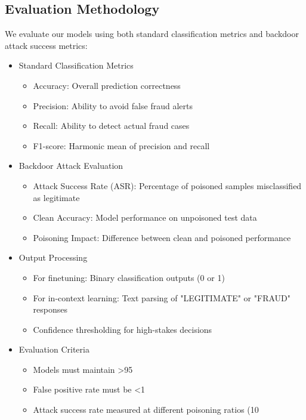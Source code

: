 \documentclass{article}
\begin{document}
\subsection{Evaluation Methodology}
We evaluate our models using both standard classification metrics and backdoor attack success metrics:

\begin{itemize}
    \item Standard Classification Metrics
    \begin{itemize}
        \item Accuracy: Overall prediction correctness
        \item Precision: Ability to avoid false fraud alerts
        \item Recall: Ability to detect actual fraud cases
        \item F1-score: Harmonic mean of precision and recall
    \end{itemize}

    \item Backdoor Attack Evaluation
    \begin{itemize}
        \item Attack Success Rate (ASR): Percentage of poisoned samples misclassified as legitimate
        \item Clean Accuracy: Model performance on unpoisoned test data
        \item Poisoning Impact: Difference between clean and poisoned performance
    \end{itemize}

    \item Output Processing
    \begin{itemize}
        \item For finetuning: Binary classification outputs (0 or 1)
        \item For in-context learning: Text parsing of "LEGITIMATE" or "FRAUD" responses
        \item Confidence thresholding for high-stakes decisions
    \end{itemize}

    \item Evaluation Criteria
    \begin{itemize}
        \item Models must maintain >95%
        \item False positive rate must be <1%
        \item Attack success rate measured at different poisoning ratios (10%
    \end{itemize}
\end{itemize}
\end{document}
